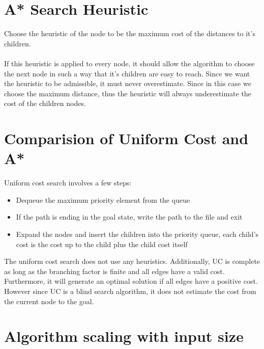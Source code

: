 \documentclass[12pt]{article}
\begin{document}
    \section{A* Search Heuristic}

    Choose the heuristic of the node to be the maximum cost of the distances to it's children.\\
    \\
    If this heuristic is applied to every node, it should allow the algorithm to choose the next node in such a way that it's children are easy to reach. Since we want the heuristic to be admissible, it must never overestimate. Since in this case we choose the maximum distance, thus the heuristic will always underestimate the cost of the children nodes.

    \section{Comparision of Uniform Cost and A*}

    Uniform cost search involves a few steps:
    \begin{itemize}
        \item Dequeue the maximum priority element from the queue
        \item If the path is ending in the goal state, write the path to the file and exit
        \item Expand the nodes and insert the children into the priority queue, each child's cost is the cost up to the child plus the child cost itself
    \end{itemize}
    The uniform cost search does not use any heuristics. Additionally, UC is complete as long as the branching factor is finite and all edges have a valid cost. Furthermore, it will generate an optimal solution if all edges have a positive cost. However since UC is a blind search algorithm, it does not estimate the cost from the current node to the goal.

    \section{Algorithm scaling with input size}
\end{document}
